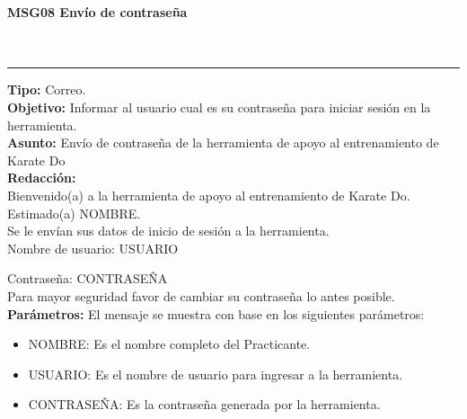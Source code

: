 \paragraph{\textcolor[rgb]{0, 0, 0.545098}{MSG08 Envío de contraseña}} \hspace{1cm} \\
\label{msj:MSG08}
\rule[3mm]{16.59cm}{0.1mm} \vspace{1mm}
\textbf{Tipo:} Correo.\\
\textbf{Objetivo:} Informar al usuario cual es su contraseña para iniciar sesión en la herramienta.\\
\textbf{Asunto:} Envío de contraseña de la herramienta de apoyo al entrenamiento de Karate Do\\
\textbf{Redacción:} \\
	Bienvenido(a) a la herramienta de apoyo al entrenamiento de Karate Do.\\

	Estimado(a) NOMBRE.\\

	Se le envían sus datos de inicio de sesión a la herramienta.\\

	Nombre de usuario: USUARIO
	
	Contraseña: CONTRASEÑA\\
	
	Para mayor seguridad favor de cambiar su contraseña lo antes posible.\\
\textbf{Parámetros:} El mensaje se muestra con base en los siguientes parámetros:
\begin{itemize} \itemsep1pt \parskip0pt 
	\item NOMBRE: Es el nombre completo del Practicante.
	\item USUARIO: Es el nombre de usuario para ingresar a la herramienta.
	\item CONTRASEÑA: Es la contraseña generada por la herramienta.
\end{itemize}

